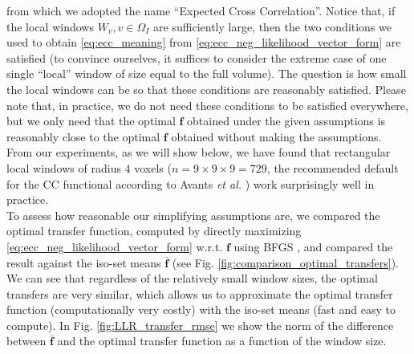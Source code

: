 from which we adopted the name ``Expected Cross Correlation''. Notice that, if the local windows $W_{v}, v\in\Omega_{I}$ are sufficiently large, then the two conditions we used to obtain \eqref{eq:ecc_meaning} from \eqref{eq:ecc_neg_likelihood_vector_form} are satisfied (to convince ourselves, it suffices to consider the extreme case of one single ``local'' window of size equal to the full volume). The question is how small the local windows can be so that these conditions are reasonably satisfied. Please note that, in practice, we do not need these conditions to be satisfied everywhere, but we only need that the optimal $\mathbf{f}$ obtained under the given assumptions is reasonably close to the optimal $\mathbf{f}$ obtained without making the assumptions. From our experiments, as we will show below, we have found that rectangular local windows of radius $4$ voxels ($n=9\times 9\times 9 = 729$, the recommended default for the CC functional according to Avants {\it et al.} \cite{Avants2011}) work surprisingly well in practice.\\

To assess how reasonable our simplifying assumptions are, we compared the optimal transfer function, computed by directly maximizing \eqref{eq:ecc_neg_likelihood_vector_form} w.r.t. $\mathbf{f}$ using BFGS \cite{GVK502988711}, and compared the result against the iso-set means $\mathbf{\bar{f}}$ (see Fig. \ref{fig:comparison_optimal_transfers}). We can see that regardless of the relatively small window sizes, the optimal transfers are very similar, which allows us to approximate the optimal transfer function (computationally very costly) with the iso-set means (fast and easy to compute). In Fig. \ref{fig:LLR_transfer_rmse} we show the norm of the difference between $\mathbf{\bar{f}}$ and the optimal transfer function as a function of the window size. \\

